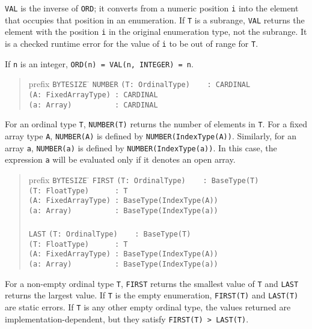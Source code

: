 \documentclass[10pt]{article}
\begin{document}
\verb|VAL| is the inverse of \verb|ORD|; it converts from a numeric position
\verb|i| into the element that occupies that position in an enumeration.  If
\verb|T| is a subrange, \verb|VAL| returns the element with the position
\verb|i| in the original enumeration type, not the subrange.  It is a checked
runtime error for the value of \verb|i| to be out of range for \verb|T|.

If \verb|n| is an integer, \verb|ORD(n) = VAL(n, INTEGER) = n|.

\begin{quote}
  \begin{tabbing}
    prefix \= \verb|BYTESIZE| \= \kill
           \> \verb|NUMBER| \> \verb|(T: OrdinalType)    : CARDINAL| \\
           \>               \> \verb|(A: FixedArrayType) : CARDINAL| \\
           \>               \> \verb|(a: Array)          : CARDINAL|
  \end{tabbing}
\end{quote}
For an ordinal type \verb|T|, \verb|NUMBER(T)| returns the number of elements
in \verb|T|.  For a fixed array type \verb|A|, \verb|NUMBER(A)| is defined by
\verb|NUMBER(IndexType(A))|.  Similarly, for an array \verb|a|,
\verb|NUMBER(a)| is defined by \verb|NUMBER(IndexType(a))|.  In this case, the
expression \verb|a| will be evaluated only if it denotes an open array.

\begin{quote}
  \begin{tabbing}
    prefix \= \verb|BYTESIZE| \= \kill
    \> \verb|FIRST| \> \verb|(T: OrdinalType)    : BaseType(T)| \\
    \>              \> \verb|(T: FloatType)      : T| \\
    \>              \> \verb|(A: FixedArrayType) : BaseType(IndexType(A))| \\
    \>              \> \verb|(a: Array)          : BaseType(IndexType(a))| \\
    \\
    \> \verb|LAST|  \> \verb|(T: OrdinalType)    : BaseType(T)| \\
    \>              \> \verb|(T: FloatType)      : T| \\
    \>              \> \verb|(A: FixedArrayType) : BaseType(IndexType(A))| \\
    \>              \> \verb|(a: Array)          : BaseType(IndexType(a))|
  \end{tabbing}
\end{quote}
For a non-empty ordinal type \verb|T|, \verb|FIRST| returns the smallest value
of \verb|T| and \verb|LAST| returns the largest value.  If \verb|T| is the
empty enumeration, \verb|FIRST(T)| and \verb|LAST(T)| are static errors.  If
\verb|T| is any other empty ordinal type, the values returned are
implementation-dependent, but they satisfy \verb|FIRST(T) > LAST(T)|.
\end{document}
